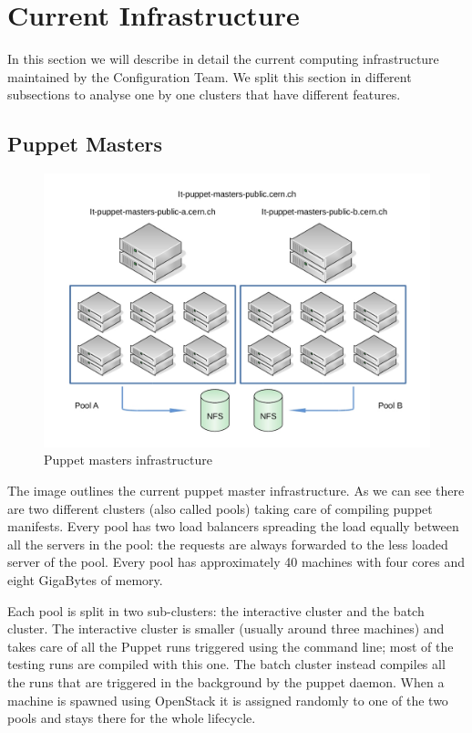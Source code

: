 \section{Current Infrastructure}

In this section we will describe in detail the current computing
infrastructure maintained by the Configuration Team. We split this section
in different subsections to analyse one by one clusters that have
different features.

\subsection{Puppet Masters}

\begin{figure}[H]
\includegraphics[width=\textwidth,height=\textheight,keepaspectratio]{ConfigurationManagement/Infrastructure_pm.jpg}
\caption{Puppet masters infrastructure}
\end{figure}

The image outlines the current puppet master infrastructure. As we can see
there are two different clusters (also called pools) taking care of
compiling puppet manifests. Every pool has two load balancers spreading
the load equally between all the servers in the pool: the requests are
always forwarded to the less loaded server of the pool. Every pool has
approximately 40 machines with four cores and eight GigaBytes of memory.

Each pool is split in two sub-clusters: the interactive cluster and the
batch cluster. The interactive cluster is smaller (usually around three
machines) and takes care of all the Puppet runs triggered using the
command line; most of the testing runs are compiled with this one. The
batch cluster instead compiles all the runs that are triggered in the
background by the puppet daemon. When a machine is spawned using OpenStack
it is assigned randomly to one of the two pools and stays there for the
whole lifecycle.

